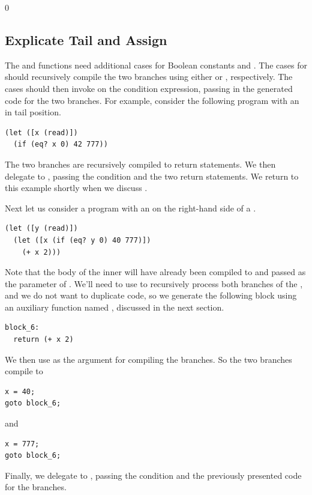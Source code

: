 \documentclass[7x10]{TimesAPriori_MIT}%
\def\racketEd{0}
\def\edition{0}
\numberwithin{theorem}{chapter}
\numberwithin{definition}{chapter}
\numberwithin{equation}{chapter}
\begin{document}
{\if\edition\racketEd

\subsection{Explicate Tail and Assign}
  
The  and  functions need
additional cases for Boolean constants and .  The cases for
 should recursively compile the two branches using either
 or , respectively. The
cases should then invoke  on the condition
expression, passing in the generated code for the two branches.  For
example, consider the following program with an  in tail
position.
\begin{lstlisting}
(let ([x (read)])
  (if (eq? x 0) 42 777))
\end{lstlisting}
The two branches are recursively compiled to return statements.  We
then delegate to , passing the condition
 and the two return statements.  We return to this
example shortly when we discuss .

Next let us consider a program with an  on the right-hand
side of a .
\begin{lstlisting}
(let ([y (read)])
  (let ([x (if (eq? y 0) 40 777)])
    (+ x 2)))
\end{lstlisting}
Note that the body of the inner  will have already been
compiled to  and passed as the 
parameter of . We'll need to use 
to recursively process both branches of the , and we do not
want to duplicate code, so we generate the following block using an
auxiliary function named , discussed in the next
section.
\begin{lstlisting}
block_6:
  return (+ x 2)
\end{lstlisting}
We then use  as the  argument for
compiling the branches. So the two branches compile to
\begin{center}
\begin{minipage}{0.2\textwidth}
\begin{lstlisting}
x = 40;
goto block_6;
\end{lstlisting}
\end{minipage}
\hspace{0.5in} and \hspace{0.5in}
\begin{minipage}{0.2\textwidth}
\begin{lstlisting}
x = 777;
goto block_6;
\end{lstlisting}
\end{minipage}
\end{center}
Finally, we delegate to , passing the condition
 and the previously presented code for the branches.

}
\end{document}
